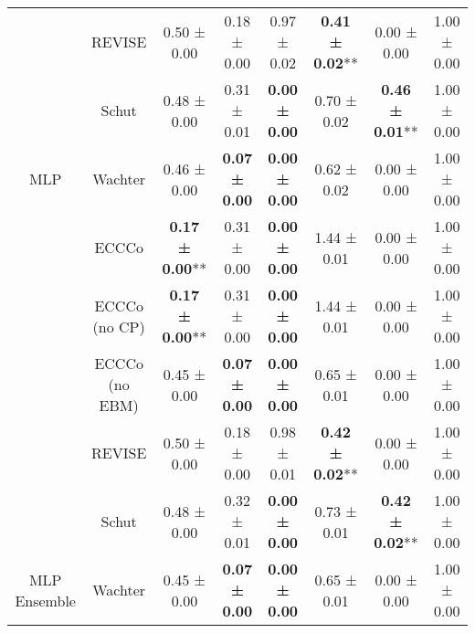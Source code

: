 \begin{table}
{\begin{tabular}[t]{cccccccc}
 & REVISE & 0.50 ± 0.00\hphantom{*}\hphantom{*} & 0.18 ± 0.00\hphantom{*}\hphantom{*} & 0.97 ± 0.02\hphantom{*}\hphantom{*} & \textbf{0.41 ± 0.02}** & 0.00 ± 0.00\hphantom{*}\hphantom{*} & 1.00 ± 0.00\hphantom{*}\hphantom{*}\\

 & Schut & 0.48 ± 0.00\hphantom{*}\hphantom{*} & 0.31 ± 0.01\hphantom{*}\hphantom{*} & \textbf{0.00 ± 0.00}\hphantom{*}\hphantom{*} & 0.70 ± 0.02\hphantom{*}\hphantom{*} & \textbf{0.46 ± 0.01}** & 1.00 ± 0.00\hphantom{*}\hphantom{*}\\

\multirow[t]{-6}{*}{\centering\arraybackslash MLP} & Wachter & 0.46 ± 0.00\hphantom{*}\hphantom{*} & \textbf{0.07 ± 0.00}\hphantom{*}\hphantom{*} & \textbf{0.00 ± 0.00}\hphantom{*}\hphantom{*} & 0.62 ± 0.02\hphantom{*}\hphantom{*} & 0.00 ± 0.00\hphantom{*}\hphantom{*} & 1.00 ± 0.00\hphantom{*}\hphantom{*}\\
\cmidrule{1-8}
 & ECCCo & \textbf{0.17 ± 0.00}** & 0.31 ± 0.00\hphantom{*}\hphantom{*} & \textbf{0.00 ± 0.00}\hphantom{*}\hphantom{*} & 1.44 ± 0.01\hphantom{*}\hphantom{*} & 0.00 ± 0.00\hphantom{*}\hphantom{*} & 1.00 ± 0.00\hphantom{*}\hphantom{*}\\

 & ECCCo (no CP) & \textbf{0.17 ± 0.00}** & 0.31 ± 0.00\hphantom{*}\hphantom{*} & \textbf{0.00 ± 0.00}\hphantom{*}\hphantom{*} & 1.44 ± 0.01\hphantom{*}\hphantom{*} & 0.00 ± 0.00\hphantom{*}\hphantom{*} & 1.00 ± 0.00\hphantom{*}\hphantom{*}\\

 & ECCCo (no EBM) & 0.45 ± 0.00\hphantom{*}\hphantom{*} & \textbf{0.07 ± 0.00}\hphantom{*}\hphantom{*} & \textbf{0.00 ± 0.00}\hphantom{*}\hphantom{*} & 0.65 ± 0.01\hphantom{*}\hphantom{*} & 0.00 ± 0.00\hphantom{*}\hphantom{*} & 1.00 ± 0.00\hphantom{*}\hphantom{*}\\

 & REVISE & 0.50 ± 0.00\hphantom{*}\hphantom{*} & 0.18 ± 0.00\hphantom{*}\hphantom{*} & 0.98 ± 0.01\hphantom{*}\hphantom{*} & \textbf{0.42 ± 0.02}** & 0.00 ± 0.00\hphantom{*}\hphantom{*} & 1.00 ± 0.00\hphantom{*}\hphantom{*}\\

 & Schut & 0.48 ± 0.00\hphantom{*}\hphantom{*} & 0.32 ± 0.01\hphantom{*}\hphantom{*} & \textbf{0.00 ± 0.00}\hphantom{*}\hphantom{*} & 0.73 ± 0.01\hphantom{*}\hphantom{*} & \textbf{0.42 ± 0.02}** & 1.00 ± 0.00\hphantom{*}\hphantom{*}\\

\multirow[t]{-6}{*}{\centering\arraybackslash MLP Ensemble} & Wachter & 0.45 ± 0.00\hphantom{*}\hphantom{*} & \textbf{0.07 ± 0.00}\hphantom{*}\hphantom{*} & \textbf{0.00 ± 0.00}\hphantom{*}\hphantom{*} & 0.65 ± 0.01\hphantom{*}\hphantom{*} & 0.00 ± 0.00\hphantom{*}\hphantom{*} & 1.00 ± 0.00\hphantom{*}\hphantom{*}\\
\bottomrule
\end{tabular}}
\end{table}
